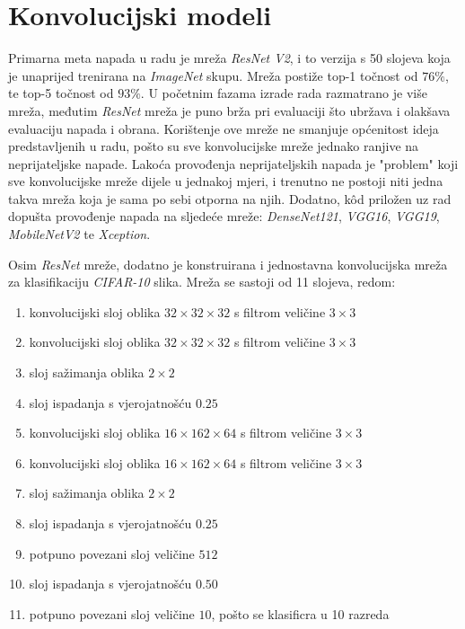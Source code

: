 \documentclass[utf8, diplomski]{fer}
\begin{document}
\section{Konvolucijski modeli}\label{custom_model}
Primarna meta napada u radu je mreža \textit{ResNet V2}\citep{resnetv2}, i to verzija s 50 slojeva koja je unaprijed trenirana na \textit{ImageNet} skupu. Mreža postiže top-1 točnost od $76\%$, te top-5 točnost od $93\%$.  U početnim fazama izrade rada razmatrano je više mreža, međutim \textit{ResNet} mreža je puno brža pri evaluaciji što ubržava i olakšava evaluaciju napada i obrana. Korištenje ove mreže ne smanjuje općenitost ideja predstavljenih u radu, pošto su sve konvolucijske mreže jednako ranjive na neprijateljske napade. Lakoća provođenja neprijateljskih napada je "problem" koji sve konvolucijske mreže dijele u jednakoj mjeri, i trenutno ne postoji niti jedna takva mreža koja je sama po sebi otporna na njih. Dodatno, kôd priložen uz rad dopušta provođenje napada na sljedeće mreže: \textit{DenseNet121}, \textit{VGG16}, \textit{VGG19}, \textit{MobileNetV2} te \textit{Xception}.
\par
Osim \textit{ResNet} mreže, dodatno je konstruirana i jednostavna konvolucijska mreža za klasifikaciju \textit{CIFAR-10} slika. Mreža se sastoji od 11 slojeva, redom:
\begin{enumerate}[noitemsep, label=\textbullet]
  \item konvolucijski sloj oblika $32\times32\times32$ s filtrom veličine $3\times3$
  \item konvolucijski sloj oblika $32\times32\times32$ s filtrom veličine $3\times3$
  \item sloj sažimanja oblika $2\times2$
  \item sloj ispadanja s vjerojatnošću $0.25$
  \item konvolucijski sloj oblika $16\times162\times64$ s filtrom veličine $3\times3$
  \item konvolucijski sloj oblika $16\times162\times64$ s filtrom veličine $3\times3$
  \item sloj sažimanja oblika $2\times2$
  \item sloj ispadanja s vjerojatnošću $0.25$
  \item potpuno povezani sloj veličine $512$
  \item sloj ispadanja s vjerojatnošću $0.50$
  \item potpuno povezani sloj veličine $10$, pošto se klasificra u 10 razreda
\end{enumerate}
\end{document}
